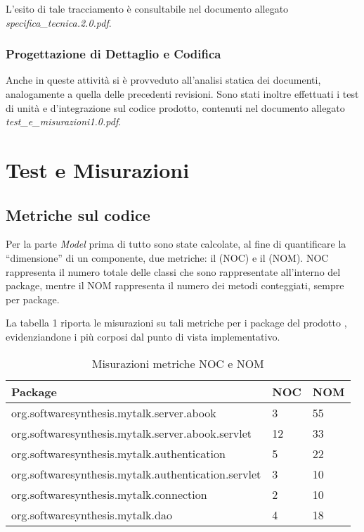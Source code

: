 L'esito di tale tracciamento è consultabile nel documento allegato \textit{specifica\_tecnica.2.0.pdf}.
\clearpage

\subsubsection {Progettazione di Dettaglio e Codifica}
Anche in queste attività si è provveduto all'analisi statica dei documenti, analogamente a quella delle precedenti revisioni.
Sono stati inoltre effettuati i test di unità e d'integrazione sul codice prodotto, contenuti nel documento allegato \textit{test\_e\_misurazioni1.0.pdf}.

\section{Test e Misurazioni}
\subsection{Metriche sul codice}
Per la parte \textit{Model} prima di tutto sono state calcolate, al fine di quantificare la ``dimensione'' di un componente, due metriche: il  (NOC) e il  (NOM).
NOC rappresenta il numero totale delle classi che sono rappresentate all'interno del package, mentre il NOM rappresenta il numero dei metodi conteggiati, sempre per package.

La tabella 1 riporta le misurazioni su tali metriche per i package del prodotto \caName{}, evidenziandone i più corposi dal punto di vista implementativo.

\setcounter{table}{0}

\begin{table}[H]
\centering
{}
\begin{tabular}{p{}ll}
\toprule
Package & NOC  & NOM\\
\midrule
org.softwaresynthesis.mytalk.server.abook & 3 & 55\\
org.softwaresynthesis.mytalk.server.abook.servlet & 12 & 33\\
org.softwaresynthesis.mytalk.authentication & 5 & 22\\
org.softwaresynthesis.mytalk.authentication.servlet & 3 & 10\\
org.softwaresynthesis.mytalk.connection & 2 & 10\\
org.softwaresynthesis.mytalk.dao & 4 & 18\\
\bottomrule
\end{tabular}
\caption{Misurazioni metriche NOC e NOM} \label{tab:metricheNOCNOM}
\end{table}

